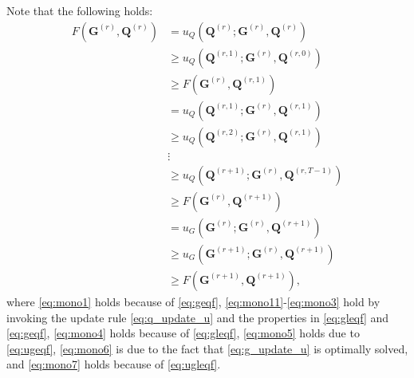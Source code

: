 \documentclass[10pt,journal]{IEEEtran}
\newcommand{\Q}{\boldsymbol{Q}}
\begin{document}
Note that the following holds:
\begin{subequations}\label{eq:mono}
\begin{align}
         F\left({\bm G}^{(r)},{\bm Q}^{(r)}\right) & = u_Q(\Q^{(r)};{\bm G}^{(r)},{\bm Q}^{(r)}) \label{eq:mono1}\\
                                                   & \geq u_Q(\Q^{(r,1)};{\bm G}^{(r)},{\bm Q}^{(r,0)}) \label{eq:mono11}\\
                                                   & \geq F\left({\bm G}^{(r)},{\bm Q}^{(r,1)}\right) \label{eq:mono12}\\
                                                   & = u_Q(\Q^{(r,1)};{\bm G}^{(r)},{\bm Q}^{(r,1)}) \label{eq:mono13}\\
                                                   & \geq u_Q(\Q^{(r,2)};{\bm G}^{(r)},{\bm Q}^{(r,1)}) \label{eq:mono14}\\
                                                   &\vdots\\
                                                   & \geq u_Q(\Q^{(r+1)};{\bm G}^{(r)},{\bm Q}^{(r,T-1)}) \label{eq:mono3}\\
                                                   &\geq F\left({\bm G}^{(r)},{\bm Q}^{(r+1)}\right) \label{eq:mono4}\\
                                                   &= u_G\left({\bm G}^{(r)};{\bm G}^{(r)},{\bm Q}^{(r+1)}\right) \label{eq:mono5}\\
												   &\geq u_G\left({\bm G}^{(r+1)};{\bm G}^{(r)},{\bm Q}^{(r+1)}\right) \label{eq:mono6}\\
												   &\geq F\left({\bm G}^{(r+1)},{\bm Q}^{(r+1)}\right), \label{eq:mono7}
\end{align}
\end{subequations}
where \eqref{eq:mono1} holds because of \eqref{eq:geqf}, \eqref{eq:mono11}-\eqref{eq:mono3} hold by invoking the update rule \eqref{eq:q_update_u} and the properties in \eqref{eq:gleqf} and \eqref{eq:geqf},
\eqref{eq:mono4} holds because of \eqref{eq:gleqf},
\eqref{eq:mono5} holds due to \eqref{eq:ugeqf},
\eqref{eq:mono6} is due to the fact that \eqref{eq:g_update_u} is optimally solved,
and \eqref{eq:mono7} holds because of \eqref{eq:ugleqf}.
\end{document}
